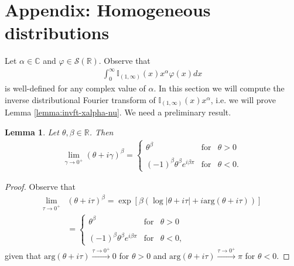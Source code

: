 \documentclass[a4paper, reqno, 11pt]{amsart}
\newtheorem{lemma}[theorem]{Lemma}
\theoremstyle{definition}
\begin{document}
	
	\section{Appendix: Homogeneous distributions}\label{app:temp-dist-xalpha+}
Let $\alpha \in \mathbb{C}$ and $\varphi \in \mathcal{S}(\mathbb{R})$. Observe that
\begin{align*}
		\int_0^{\infty} \mathbb{I}_{(1,\infty)}(x) x^{\alpha} \varphi(x) dx
	\end{align*}
	is well-defined for any complex value of $\alpha$. In this section we will compute the inverse distributional Fourier transform of $\mathbb{I}_{(1,\infty)}(x) x^{\alpha}$, i.e. we will prove Lemma \ref{lemma:invft-xalpha-nu}. We need a preliminary result.

\begin{lemma}\label{lemma:limit-complex}
	Let $\theta, \beta \in \mathbb{R}$. Then
	\begin{align*}
	\lim_{\gamma \rightarrow 0^+} (\theta + i \gamma)^{\beta} = \left\{ \begin{array}{lcc} \theta^{\beta} & \text{for} & \theta > 0 \\ \\ (-1)^{\beta}\theta^{\beta} e^{i\beta\pi} & \text{for} & \theta < 0. \end{array} \right.
	\end{align*}
	\end{lemma}
	
\begin{proof}
	Observe that
	\begin{align*}
		\lim_{\tau \rightarrow 0^+} &(\theta + i \tau)^{\beta} = \exp[\beta(\log|\theta + i\tau| + i \text{arg}(\theta+i\tau))] \nonumber\\
		&= \left\{ \begin{array}{lcc} \theta^{\beta} & \text{for} & \theta > 0 \\ \\ (-1)^{\beta}\theta^{\beta} e^{i\beta \pi} & \text{for} & \theta < 0, \end{array} \right. 
	\end{align*}
	given that $\text{arg}(\theta + i\tau) \overset{\tau \rightarrow 0^+}{\rightarrow} 0$ for $\theta > 0$ and $\text{arg}(\theta + i\tau) \overset{\tau \rightarrow 0^+}{\rightarrow} \pi$ for $\theta < 0$.
	\end{proof}
	
\end{document}
